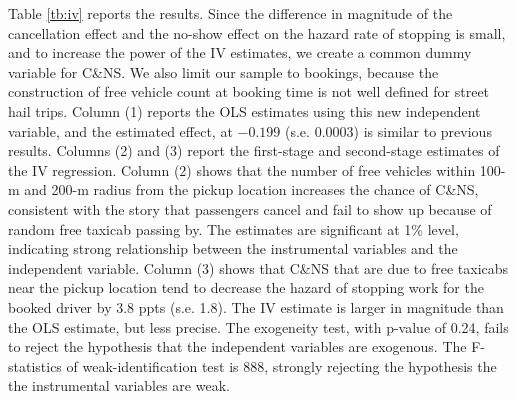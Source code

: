 \documentclass[reviewmode]{restat}
\begin{document}
\begin{appendices}
Table \ref{tb:iv} reports the results. Since the difference in magnitude of the cancellation effect
and the no-show effect on the hazard rate of stopping is small, 
and to increase the power of the IV estimates, we create
a common dummy variable for C\&NS. We also limit our sample to bookings, because the construction
of free vehicle count at booking time is not well defined for street hail trips.
Column (1) reports the OLS estimates using this new
independent variable, and the estimated effect, at $-0.199$ (s.e. $0.0003$) is similar 
to previous results.
Columns (2) and (3) report the first-stage and second-stage estimates of the IV regression.
Column (2) shows that the number of free vehicles within 100-m and 200-m radius from 
the pickup location increases the chance of C\&NS, consistent with the story that
passengers cancel and fail to show up because of random free taxicab passing by.
The estimates are significant at 1\% level, indicating strong relationship between
the instrumental variables and the independent variable.
Column (3) shows that C\&NS  that are due to free taxicabs near the pickup location
tend to decrease the hazard of stopping work for the booked driver by 3.8 ppts (s.e. 1.8).
The IV estimate is larger in magnitude than the OLS estimate, but less precise.
The exogeneity test, with p-value of 0.24, fails to reject the hypothesis that
the independent variables are exogenous. The F-statistics of weak-identification test is 888, strongly rejecting the hypothesis
the the instrumental variables are weak.



\end{appendices}
\end{document}
